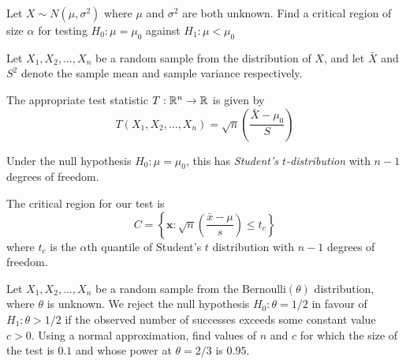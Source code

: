 \begin{example}[$t$-test]
Let $X\sim N(\mu,\sigma^2)$ where $\mu$ and $\sigma^2$ are both unknown. Find a critical region of size $\alpha$ for testing $H_0:\mu=\mu_0$ against $H_1:\mu < \mu_0$
\end{example}

\begin{solution}
Let $X_1,X_2,\ldots,X_n$ be a random sample from the distribution of $X$, and let $\bar{X}$ and $S^2$ denote the sample mean and sample variance respectively.

\bigskip
The appropriate test statistic $T:\mathbb{R}^n\to\mathbb{R}$ is given by
\[
T(X_1,X_2,\ldots,X_n) = \sqrt{n}\left(\frac{\bar{X}-\mu_0}{S}\right)
\]

Under the null hypothesis $H_0:\mu=\mu_0$, this has \emph{Student's $t$-distribution} with $n-1$ degrees of freedom.

The critical region for our test is
\[
C=\left\{\mathbf{x}:\sqrt{n}\left(\frac{\bar{x}-\mu}{s}\right) \leq t_c\right\}
\]
where $t_c$ is the $\alpha$th quantile of Student's $t$ distribution with $n-1$ degrees of freedom.
\end{solution}


\begin{example}
Let $X_1,X_2,\ldots,X_n$ be a random sample from the $\text{Bernoulli}(\theta)$ distribution, where $\theta$ is unknown. We reject the null hypothesis $H_0:\theta=1/2$ in favour of $H_1:\theta>1/2$ if the observed number of successes exceeds some constant value $c>0$. Using a normal approximation, find values of $n$ and $c$ for which the size of the test is $0.1$ and whose power at $\theta=2/3$ is $0.95$. 
\end{example}


